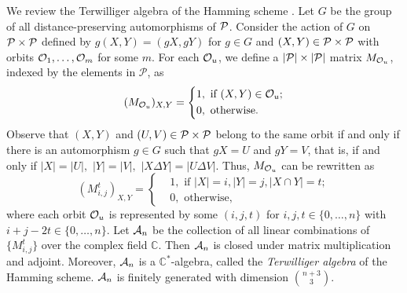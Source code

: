 \documentclass[final,onecolumn]{IEEEtran}
\theoremstyle{definition}
\newcommand{\cP}{{\mathcal P}}
\begin{document}
We review the Terwilliger algebra of the Hamming scheme \cite{Ter92,Ter93,BBIT21}. Let $G$ be the group of all distance-preserving automorphisms of ${\cal P}$. Consider the action of $G$ on ${\cal P} \times {\cal P}$ defined by $g(X, Y) = (g X, g Y)$ for $g \in G$  and  $(X, Y) \in {\cal P} \times {\cal P}$ with orbits ${\cal O}_{1}, \dots, {\cal O}_{m}$ for some $m$. For each ${\cal O}_{u}$, we define a $\lvert {\cal P} \rvert \times \lvert {\cal P} \rvert$ matrix $M_{{\cal O}_{u}}$, indexed by the elements in $\cP$, as
\begin{equation*}
	(M_{{\cal O}_{u}})_{X, Y} = \left\{
	\begin{aligned}
		&1, \text{ if } (X, Y) \in {\cal O}_{u};\\
		&0, \text{ otherwise.}
	\end{aligned} \right.
\end{equation*}
Observe that $(X, Y)$ and $(U, V)\in {\cal P} \times {\cal P}$ belong to the same orbit if and only if there is an automorphism $g\in G$ such that $gX = U$ and $gY = V$, that is, if and only if $\lvert X \rvert = \lvert U \rvert,$ $\lvert Y \rvert = \lvert V \rvert,$  $\lvert X \Delta Y \rvert = \lvert U \Delta V \rvert$. Thus, $M_{{\cal O}_{u}}$ can be rewritten as
\begin{equation*}
	(M_{i, j}^{t})_{X, Y} = \left\{
	\begin{aligned}
		&1, \text{ if } \lvert X \rvert = i, \lvert Y \rvert = j, \lvert X \cap Y \rvert = t;\\
		&0, \text{ otherwise,}
	\end{aligned} \right.
\end{equation*}
where each orbit ${\cal O}_{u}$ is represented by some $(i,j,t)$ for $i, j, t \in \{0, \dots, n\}$ with $i+j-2t \in \{0, \dots, n\}$. Let ${\cal A}_{n}$ be the collection of all linear combinations of $\{M_{i, j}^{t}\}$ over the complex field $\mathbb{C}$.  Then ${\cal A}_{n}$ is closed under matrix multiplication and adjoint. Moreover, ${\cal A}_{n}$ is a $\mathbb{C}^{*}$-algebra, called the \textit{Terwilliger algebra} of the Hamming scheme. ${\cal A}_{n}$ is finitely generated with dimension $\binom{n+3}{3}$. 
	
\end{document}
